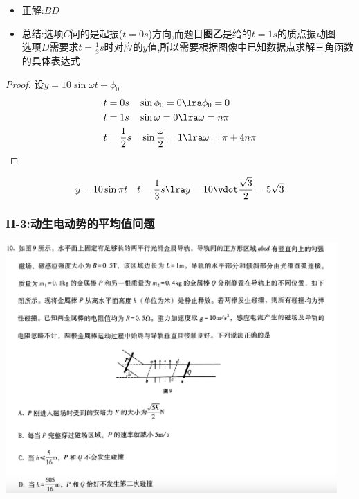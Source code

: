 \documentclass{article}
\begin{document}
\begin{itemize}
    \item 正解:\quad $BD$
    \item 总结:\quad 选项$C$问的是起振($t=0s$)方向,而题目\textbf{图乙}是给的$t=1s$的质点振动图\\
          选项$D$需要求$t=\frac{1}{3}s$时对应的$y$值,所以需要根据图像中已知数据点求解三角函数的具体表达式
\end{itemize}

\begin{proof}
    设$ y = 10 \sin{\omega t + \phi_{0}}$
    \begin{align*}
        t & = 0s \quad \sin{\phi_{0}} = 0 \lra \phi_{0} = 0                           \\
        t & = 1s \quad \sin{\omega} = 0 \lra \omega = n\pi                            \\
        t & = \frac{1}{2}s \quad \sin{\frac{\omega}{2}} = 1 \lra \omega = \pi + 4n\pi
    \end{align*}
\end{proof}
$$
    y = 10\sin{\pi t} \quad t = \frac{1}{3}s \lra y = 10 \vdot \frac{\sqrt{3}}{2} = 5\sqrt{3}
$$

\vspace{2em}

\subsubsection{II-3:动生电动势的平均值问题}
\includegraphics[width=0.95\textwidth,keepaspectratio]{./pictures/3.1-3.png}
\end{document}

